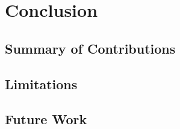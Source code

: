 \section{Conclusion}\label{sec:conclusion}


\subsection{Summary of Contributions}

\subsection{Limitations}

\subsection{Future Work}
